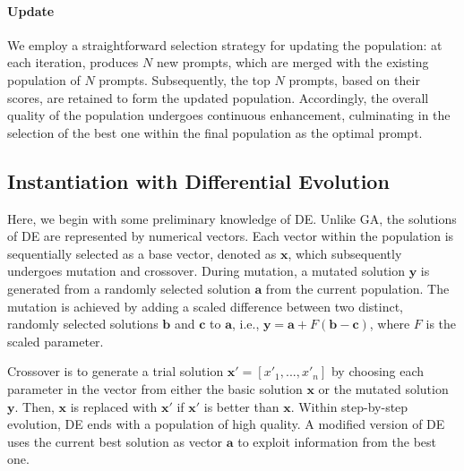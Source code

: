 \paragraph{Update} We employ a straightforward selection strategy for updating the population: at each iteration, \modelname produces $N$ new prompts, which are merged with the existing population of $N$ prompts. Subsequently, the top $N$ prompts, based on their scores, are retained to form the updated population. Accordingly, the overall quality of the population undergoes continuous enhancement, culminating in the selection of the best one within the final population as the optimal prompt.

\subsection{Instantiation with Differential Evolution}

Here, we begin with some preliminary knowledge of DE. Unlike GA, the solutions of DE are represented by numerical vectors. Each vector within the population is sequentially selected as a base vector, denoted as $\mathbf{x}$, which subsequently undergoes mutation and crossover. 
During mutation, a mutated solution $\mathbf{y}$ is generated from a randomly selected solution $\mathbf{a}$ from the current population. The mutation is achieved by adding a scaled difference between two distinct, randomly selected solutions $\mathbf{b}$ and $\mathbf{c}$ to $\mathbf{a}$, i.e., $\mathbf{y} = \mathbf{a} + F(\mathbf{b} - \mathbf{c})$, where $F$ is the scaled parameter.

Crossover is to generate a trial solution $\mathbf{x'} = [x'_1,...,x'_n]$ by choosing each parameter in the vector from either the basic solution $\mathbf{x}$ or the mutated solution $\mathbf{y}$.
Then, $\mathbf{x}$ is replaced with $\mathbf{x'}$ if $\mathbf{x'}$ is better than $\mathbf{x}$. 
Within step-by-step evolution, DE ends with a population of high quality. A modified version of DE uses the current best solution as vector $\mathbf{a}$ to exploit information from the best one.

